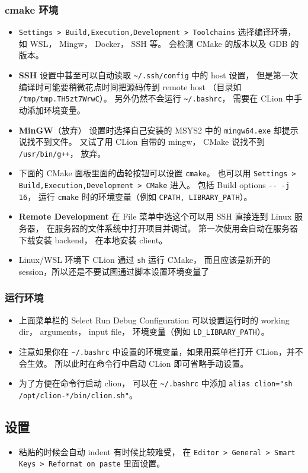 \subsubsection{cmake 环境}
\begin{itemize}
\item \verb`Settings > Build,Execution,Development > Toolchains` 选择编译环境， 如 WSL， Mingw， Docker， SSH 等。 会检测 CMake 的版本以及 GDB 的版本。
\item \textbf{SSH} 设置中甚至可以自动读取 \verb`~/.ssh/config` 中的 host 设置， 但是第一次编译时可能要稍微花点时间把源码传到 remote host （目录如 \verb`/tmp/tmp.TH5zt7WrwC`）。 另外仍然不会运行 \verb`~/.bashrc`， 需要在 CLion 中手动添加环境变量。
\item \textbf{MinGW}（放弃） 设置时选择自己安装的 MSYS2 中的 \verb`mingw64.exe` 却提示说找不到文件。 又试了用 CLion 自带的 mingw， CMake 说找不到 \verb`/usr/bin/g++`， 放弃。
\item 下面的 CMake 面板里面的齿轮按钮可以设置 \verb`cmake`。 也可以用 \verb`Settings > Build,Execution,Development > CMake` 进入。 包括 Build options \verb`-- -j 16`， 运行 \verb`cmake` 时的环境变量（例如 \verb`CPATH, LIBRARY_PATH`）。
\item \textbf{Remote Development} 在 File 菜单中选这个可以用 SSH 直接连到 Linux 服务器， 在服务器的文件系统中打开项目并调试。 第一次使用会自动在服务器下载安装 backend， 在本地安装 client。
\item Linux/WSL 环境下 CLion 通过 \verb`sh` 运行 CMake， 而且应该是新开的 session，所以还是不要试图通过脚本设置环境变量了
\end{itemize}

\subsubsection{运行环境}
\begin{itemize}
\item 上面菜单栏的 Select Run Debug Configuration 可以设置运行时的 working dir， arguments， input file， 环境变量（例如 \verb`LD_LIBRARY_PATH`）。
\item 注意如果你在 \verb`~/.bashrc` 中设置的环境变量，如果用菜单栏打开 CLion，并不会生效。 所以此时在命令行中启动 CLion 即可省略手动设置。
\item 为了方便在命令行启动 clion， 可以在 \verb`~/.bashrc` 中添加 \verb`alias clion="sh /opt/clion-*/bin/clion.sh"`。
\end{itemize}

\subsection{设置}
\begin{itemize}
\item 粘贴的时候会自动 indent 有时候比较难受， 在 \verb`Editor > General > Smart Keys > Reformat on paste` 里面设置。
\end{itemize}
